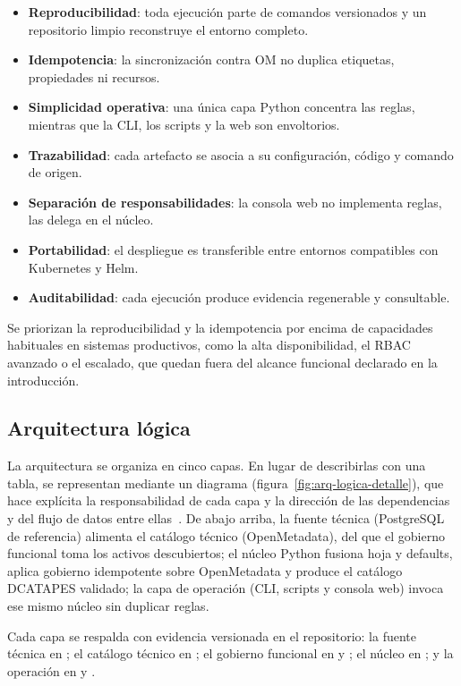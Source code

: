 \begin{itemize}
  \item \textbf{Reproducibilidad}: toda ejecución parte de comandos versionados y un repositorio limpio reconstruye el entorno completo.
  \item \textbf{Idempotencia}: la sincronización contra \ac{OM} no duplica etiquetas, propiedades ni recursos.
  \item \textbf{Simplicidad operativa}: una única capa Python concentra las reglas, mientras que la \ac{CLI}, los scripts y la web son envoltorios.
  \item \textbf{Trazabilidad}: cada artefacto se asocia a su configuración, código y comando de origen.
  \item \textbf{Separación de responsabilidades}: la consola web no implementa reglas, las delega en el núcleo.
  \item \textbf{Portabilidad}: el despliegue es transferible entre entornos compatibles con Kubernetes y Helm.
  \item \textbf{Auditabilidad}: cada ejecución produce evidencia regenerable y consultable.
\end{itemize}

Se priorizan la reproducibilidad y la idempotencia por encima de capacidades habituales en sistemas productivos, como la alta disponibilidad, el \ac{RBAC} avanzado o el escalado, que quedan fuera del alcance funcional declarado en la introducción.

\subsection{Arquitectura lógica}

La arquitectura se organiza en cinco capas. En lugar de describirlas con una tabla, se representan mediante un diagrama (figura~\ref{fig:arq-logica-detalle}), que hace explícita la responsabilidad de cada capa y la dirección de las dependencias y del flujo de datos entre ellas~\cite{mermaidDocs}. De abajo arriba, la fuente técnica (PostgreSQL de referencia) alimenta el catálogo técnico (OpenMetadata), del que el gobierno funcional toma los activos descubiertos; el núcleo Python fusiona hoja y defaults, aplica gobierno idempotente sobre OpenMetadata y produce el catálogo \ac{DCATAPES} validado; la capa de operación (\ac{CLI}, scripts y consola web) invoca ese mismo núcleo sin duplicar reglas.

Cada capa se respalda con evidencia versionada en el repositorio: la fuente técnica en ; el catálogo técnico en ; el gobierno funcional en  y ; el núcleo en ; y la operación en  y .


